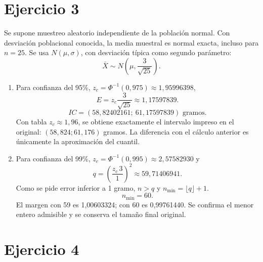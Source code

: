 \documentclass[11pt]{article}
\begin{document}
\section*{Ejercicio 3}
Se supone muestreo aleatorio independiente de la población normal. Con desviación poblacional conocida, la media muestral es normal exacta, incluso para $n=25$. Se usa $N(\mu,\sigma)$, con desviación típica como segundo parámetro:
\[\bar X\sim N\left(\mu,\frac{3}{\sqrt{25}}\right).\]
\begin{enumerate}[label=(\alph*)]\item Para confianza del 95\%, $z_c=\Phi^{-1}(0,975)\approx1,95996398$,
\[E=z_c\frac{3}{\sqrt{25}}\approx1,17597839.\]
\[IC=\boxed{(58,82402161;\ 61,17597839)}\text{ gramos}.\]
Con tabla $z_c\approx1,96$, se obtiene exactamente el intervalo impreso en el original: $(58,824;61,176)$ gramos. La diferencia con el cálculo anterior es únicamente la aproximación del cuantil.
\item Para confianza del 99\%, $z_c=\Phi^{-1}(0,995)\approx2,57582930$ y
\[q=\left(\frac{z_c\,3}{1}\right)^2\approx59,71406941.\]
Como se pide error inferior a 1 gramo, $n>q$ y $n_{\min}=\lfloor q\rfloor+1$.
\[\boxed{n_{\min}=60}.\]
El margen con 59 es 1,00603324; con 60 es 0,99761440. Se confirma el menor entero admisible y se conserva el tamaño final original.
\end{enumerate}
\clearpage
\section*{Ejercicio 4}
\end{document}
